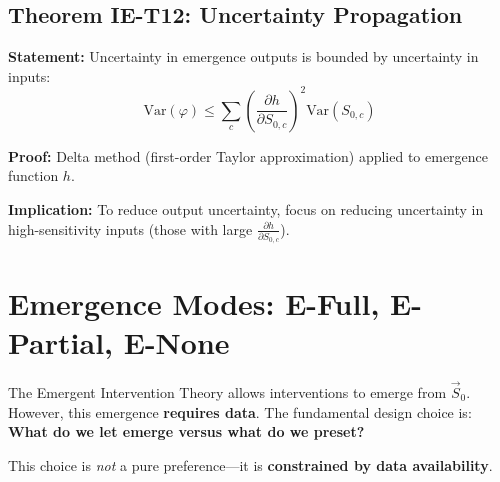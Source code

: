 \subsection{Theorem IE-T12: Uncertainty Propagation}

\begin{tcolorbox}[colback=green!5!white, colframe=green!75!black,
    title=\textbf{Theorem IE-T12: Uncertainty Propagation through Emergence}]

\textbf{Statement:} Uncertainty in emergence outputs is bounded by uncertainty in inputs:
\begin{equation}
\text{Var}(\varphi) \leq \sum_c \left(\frac{\partial h}{\partial S_{0,c}}\right)^2 \text{Var}(S_{0,c})
\end{equation}

\textbf{Proof:} Delta method (first-order Taylor approximation) applied to emergence function $h$.

\textbf{Implication:} To reduce output uncertainty, focus on reducing uncertainty in high-sensitivity inputs (those with large $\frac{\partial h}{\partial S_{0,c}}$).

\end{tcolorbox}



\section{Emergence Modes: E-Full, E-Partial, E-None}
\label{sec:ie-emergence-modes}

\begin{tcolorbox}[colback=red!5!white, colframe=red!75!black,
    title=\textbf{Critical: The Emergence-Data Interaction}]

The Emergent Intervention Theory allows interventions to emerge from $\vec{S}_0$. However, this emergence \textbf{requires data}. The fundamental design choice is: \textbf{What do we let emerge versus what do we preset?}

This choice is \textit{not} a pure preference---it is \textbf{constrained by data availability}.
\end{tcolorbox}


